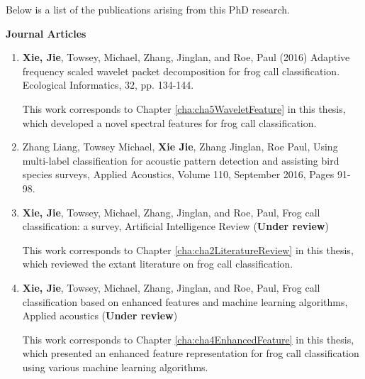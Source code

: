 Below is a list of the publications arising from this PhD research.


{\textbf{Journal Articles}}
\begin{enumerate} 
\item	\textbf{Xie, Jie}, Towsey, Michael, Zhang, Jinglan, and Roe, Paul (2016) Adaptive frequency scaled wavelet packet decomposition for frog call classification.  Ecological Informatics, 32, pp. 134-144.

This work corresponds to Chapter \ref{cha:cha5WaveletFeature} in this thesis, which developed a novel spectral features for frog call classification.

\item	Zhang Liang, Towsey Michael, \textbf{Xie Jie}, Zhang Jinglan, Roe Paul,  Using multi-label classification for acoustic pattern detection and assisting bird species surveys, Applied Acoustics, Volume 110, September 2016, Pages 91-98.

\item \textbf{Xie, Jie}, Towsey, Michael, Zhang, Jinglan, and Roe, Paul, Frog call classification: a survey, Artificial Intelligence Review (\textbf{Under review})


This work corresponds to Chapter \ref{cha:cha2LiteratureReview} in this thesis, which reviewed the extant literature on frog call classification.


\item  \textbf{Xie, Jie}, Towsey, Michael, Zhang, Jinglan, and Roe, Paul, Frog call classification based on enhanced features and machine learning algorithms, Applied acoustics (\textbf{Under review})

This work corresponds to Chapter \ref{cha:cha4EnhancedFeature} in this thesis, which presented an enhanced feature representation for frog call classification using various machine learning algorithms.


\end{enumerate}

